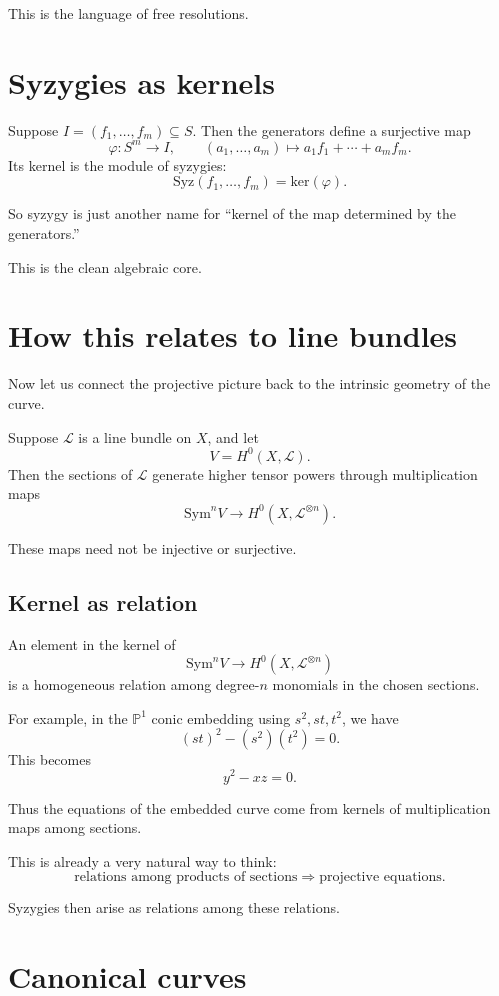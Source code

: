 \documentclass[11pt]{article}
\theoremstyle{definition}
\theoremstyle{remark}
\newcommand{\PP}{\mathbb{P}}
\newcommand{\cL}{\mathcal{L}}
\newcommand{\Syz}{\mathrm{Syz}}
\newcommand{\kerR}{\mathrm{ker}}
\newcommand{\Sym}{\mathrm{Sym}}
\begin{document}
	This is the language of free resolutions.
	
	\section{Syzygies as kernels}
	
	Suppose \(I=(f_1,\dots,f_m)\subseteq S\). Then the generators define a surjective map
	\[
	\varphi:S^m\to I,\qquad
	(a_1,\dots,a_m)\mapsto a_1f_1+\cdots+a_mf_m.
	\]
	Its kernel is the module of syzygies:
	\[
	\Syz(f_1,\dots,f_m)=\kerR(\varphi).
	\]
	
	So syzygy is just another name for ``kernel of the map determined by the generators.''
	
	This is the clean algebraic core.
	
	\section{How this relates to line bundles}
	
	Now let us connect the projective picture back to the intrinsic geometry of the curve.
	
	Suppose \(\cL\) is a line bundle on \(X\), and let
	\[
	V=H^0(X,\cL).
	\]
	Then the sections of \(\cL\) generate higher tensor powers through multiplication maps
	\[
	\Sym^n V \longrightarrow H^0(X,\cL^{\otimes n}).
	\]
	
	These maps need not be injective or surjective.
	
	\subsection{Kernel as relation}
	
	An element in the kernel of
	\[
	\Sym^n V \to H^0(X,\cL^{\otimes n})
	\]
	is a homogeneous relation among degree-\(n\) monomials in the chosen sections.
	
	For example, in the \(\PP^1\) conic embedding using \(s^2,st,t^2\), we have
	\[
	(st)^2 - (s^2)(t^2)=0.
	\]
	This becomes
	\[
	y^2-xz=0.
	\]
	
	Thus the equations of the embedded curve come from kernels of multiplication maps among sections.
	
	This is already a very natural way to think:
	\[
	\text{relations among products of sections} \Rightarrow \text{projective equations}.
	\]
	
	Syzygies then arise as relations among these relations.
	
	\section{Canonical curves}
	
\end{document}
